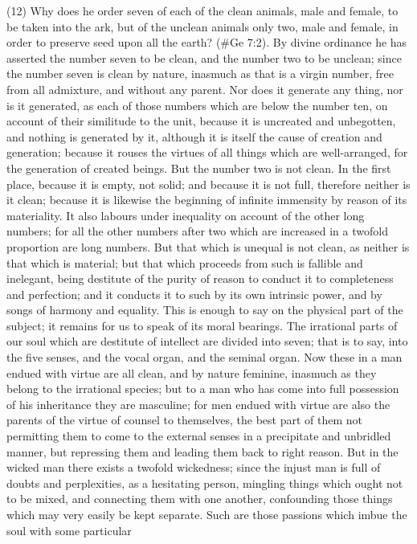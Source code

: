 (12) Why does he order seven of each of the clean animals, male and female, to be taken into the
ark, but of the unclean animals only two, male and female, in order to preserve seed upon all the
earth? (\#Ge 7:2). By divine ordinance he has asserted the number seven to be clean, and the
number two to be unclean; since the number seven is clean by nature, inasmuch as that is a virgin
number, free from all admixture, and without any parent. Nor does it generate any thing, nor is it
generated, as each of those numbers which are below the number ten, on account of their
similitude to the unit, because it is uncreated and unbegotten, and nothing is generated by it,
although it is itself the cause of creation and generation; because it rouses the virtues of all things
which are well-arranged, for the generation of created beings. But the number two is not clean. In
the first place, because it is empty, not solid; and because it is not full, therefore neither is it clean;
because it is likewise the beginning of infinite immensity by reason of its materiality. It also labours
under inequality on account of the other long numbers; for all the other numbers after two which are
increased in a twofold proportion are long numbers. But that which is unequal is not clean, as
neither is that which is material; but that which proceeds from such is fallible and inelegant, being
destitute of the purity of reason to conduct it to completeness and perfection; and it conducts it to
such by its own intrinsic power, and by songs of harmony and equality. This is enough to say on the
physical part of the subject; it remains for us to speak of its moral bearings. The irrational parts of
our soul which are destitute of intellect are divided into seven; that is to say, into the five senses,
and the vocal organ, and the seminal organ. Now these in a man endued with virtue are all clean,
and by nature feminine, inasmuch as they belong to the irrational species; but to a man who has
come into full possession of his inheritance they are masculine; for men endued with virtue are
also the parents of the virtue of counsel to themselves, the best part of them not permitting them to
come to the external senses in a precipitate and unbridled manner, but repressing them and
leading them back to right reason. But in the wicked man there exists a twofold wickedness; since
the injust man is full of doubts and perplexities, as a hesitating person, mingling things which ought
not to be mixed, and connecting them with one another, confounding those things which may very
easily be kept separate. Such are those passions which imbue the soul with some particular
